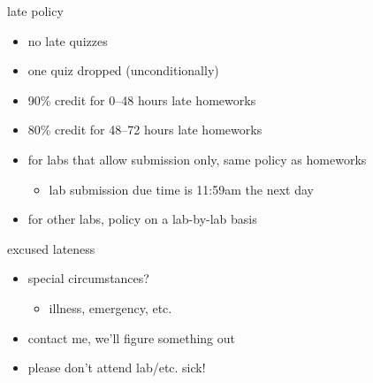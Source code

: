 
\begin{frame}{late policy}
    \begin{itemize}
    \item no late quizzes
    \item one quiz dropped (unconditionally)
    \vspace{.5cm}
    \item 90\% credit for 0--48 hours late homeworks
    \item 80\% credit for 48--72 hours late homeworks
    \vspace{.5cm}
    \item for labs that allow submission only, same policy as homeworks
        \begin{itemize}
        \item lab submission due time is 11:59am the next day
        \end{itemize}
    \item for other labs, policy on a lab-by-lab basis
    \end{itemize}
\end{frame}


\begin{frame}{excused lateness}
    \begin{itemize}
    \item special circumstances?
        \begin{itemize}
        \item illness, emergency, etc.
        \end{itemize}
    \item contact me, we'll figure something out
    \vspace{.5cm}
    \item please don't attend lab/etc. sick!
    \end{itemize}
\end{frame}
